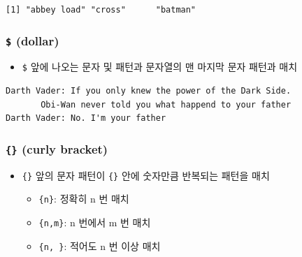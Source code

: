 \documentclass[
  11pt,
]{krantz}
\newenvironment{Shaded}{\begin{snugshade}}{\end{snugshade}}
\newcommand{\KeywordTok}[1]{\textcolor[rgb]{0.27,0.27,0.27}{\textbf{#1}}}
\newcommand{\NormalTok}[1]{#1}
\newcommand{\StringTok}[1]{\textcolor[rgb]{0.5,0.5,0.5}{#1}}
\providecommand{\tightlist}{%
  \setlength{\itemsep}{0pt}\setlength{\parskip}{0pt}}
\begin{document}
\begin{verbatim}
[1] "abbey load" "cross"      "batman"    
\end{verbatim}

\normalsize

\hypertarget{dollar}{%
\subsubsection*{\texorpdfstring{\textbf{\texttt{\$} (dollar)}}{\$ (dollar)}}\label{dollar}}


\begin{itemize}
\tightlist
\item
  \texttt{\$} 앞에 나오는 문자 및 패턴과 문자열의 맨 마지막 문자 패턴과 매치
\end{itemize}

\footnotesize

\begin{Shaded}
\end{Shaded}

\begin{verbatim}
Darth Vader: If you only knew the power of the Dark Side. 
       Obi-Wan never told you what happend to your father
Darth Vader: No. I'm your father
\end{verbatim}

\normalsize

\hypertarget{c-bracket}{%
\subsubsection*{\texorpdfstring{\textbf{\texttt{\{\}} (curly bracket)}}{\{\} (curly bracket)}}\label{c-bracket}}


\begin{itemize}
\tightlist
\item
  \texttt{\{\}} 앞의 문자 패턴이 \texttt{\{\}} 안에 숫자만큼 반복되는 패턴을 매치

  \begin{itemize}
  \tightlist
  \item
    \texttt{\{n\}}: 정확히 n 번 매치
  \item
    \texttt{\{n,m\}}: n 번에서 m 번 매치
  \item
    \texttt{\{n,\ \}}: 적어도 n 번 이상 매치
  \end{itemize}
\end{itemize}
\end{document}
